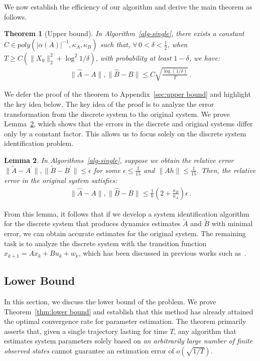 \documentclass{article}
\newtheorem{theorem}{Theorem}
\newtheorem{lemma}[theorem]{Lemma}
\theoremstyle{definition}
\begin{document}
We now establish the efficiency of our algorithm and derive the main theorem as follows.
\begin{theorem}[Upper bound]\label{thm:main-stable}
In Algorithm~\ref{alg-single}, there exists a constant $C\in poly\left(\vert \alpha(A)\vert^{-1},\kappa_{A},\kappa_{B}\right)$ such that, $\forall\,0<\delta<\frac{1}{2}$, when $T\geq C\left(\|X_{0}\|^{2}_{2}+\log^{2}{1/\delta}\right)$, with probability at least $1-\delta$, we have:
	\begin{align}
	\|\hat{A}-A\|,\|\hat{B}-B\|\leq C\sqrt{\frac{\log(1/\delta)}{T}}\,.
	\end{align}
\end{theorem}

We defer the proof of the theorem to Appendix~\ref{sec:upper bound} and highlight the key idea below.
The key idea of the proof is to analyze the error transformation from the discrete system to the original system. We prove Lemma~\ref{lem:error-transform}, which shows that the errors in the discrete and original systems differ only by a constant factor. This allows us to focus solely on the discrete system identification problem.

\begin{lemma}\label{lem:error-transform}
In Algorithms~\ref{alg-single}, suppose we obtain the relative error $\|\widetilde{A}-A^{'}\|,\|\widetilde{B}-B^{'}\|\leq \epsilon$ for some $\epsilon\leq \frac{1}{15}$ and $\|Ah\|\leq \frac{1}{15}$. Then, the relative error in the original system satisfies:
	\begin{align}
		\|\hat{A}-A\|,\|\hat{B}-B\|\leq \frac{1}{h}\left(2+\frac{\kappa_{B}}{\kappa_{A}}\right)\epsilon\,.
	\end{align}
\end{lemma}

From this lemma, it follows that if we develop a system identification algorithm for the discrete system that produces dynamics estimates $\widetilde{A}$ and $\widetilde{B}$ with minimal error, we can obtain accurate estimates for the original system. The remaining task is to analyze the discrete system with the transition function $x_{k+1}=Ax_{k}+Bu_{k}+w_{k}$, which has been discussed in previous works such as~\cite{ref4}.

\subsection{Lower Bound}
In this section, we discuss the lower bound of the problem. We prove Theorem~\ref{thm:lower bound} and establish that this method has already attained the optimal convergence rate for parameter estimation. The theorem primarily asserts that, given a single trajectory lasting for time $T$, any algorithm that estimates system parameters solely based on \emph{an arbitrarily large number of finite observed states} cannot guarantee an estimation error of $o(\sqrt{1/T})$.
\end{document}
